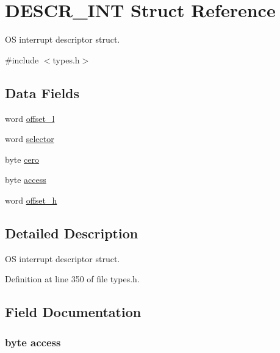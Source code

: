 \hypertarget{struct_d_e_s_c_r___i_n_t}{
\section{DESCR\_\-INT Struct Reference}
\label{struct_d_e_s_c_r___i_n_t}
}


OS interrupt descriptor struct.  




{\ttfamily \#include $<$types.h$>$}

\subsection*{Data Fields}
\begin{DoxyCompactItemize}
\item 
word \hyperlink{struct_d_e_s_c_r___i_n_t_ad333e6d5d9cab6ad3726a313057c04b4}{offset\_\-l}
\item 
word \hyperlink{struct_d_e_s_c_r___i_n_t_a8abb596f01128e9ee829157242ac3275}{selector}
\item 
byte \hyperlink{struct_d_e_s_c_r___i_n_t_a10e7734359849a8225562be7f834bf5e}{cero}
\item 
byte \hyperlink{struct_d_e_s_c_r___i_n_t_a7a3205f563ba31a30efd817ea54561fd}{access}
\item 
word \hyperlink{struct_d_e_s_c_r___i_n_t_a95502551327cda03ecf9272bef03280e}{offset\_\-h}
\end{DoxyCompactItemize}


\subsection{Detailed Description}
OS interrupt descriptor struct. 

Definition at line 350 of file types.h.



\subsection{Field Documentation}
\hypertarget{struct_d_e_s_c_r___i_n_t_a7a3205f563ba31a30efd817ea54561fd}{
\subsubsection[{access}]{\setlength{\rightskip}{0pt plus 5cm}byte {\bf access}}}
\label{struct_d_e_s_c_r___i_n_t_a7a3205f563ba31a30efd817ea54561fd}


